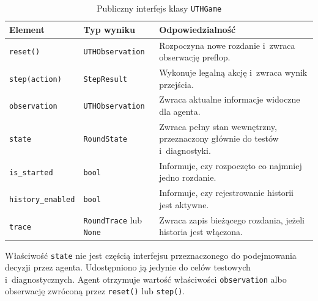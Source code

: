 \begin{table}[htbp]
    \centering
    \caption{Publiczny interfejs klasy \texttt{UTHGame}}
    \label{tab:interfejs-uth-game}
    \begin{tabular}{
        |>{\centering\arraybackslash}m{}
        |>{\centering\arraybackslash}m{}
        |p{}|
    }
        \hline
        \textbf{Element}
        &
        \textbf{Typ wyniku}
        &
        \textbf{Odpowiedzialność}
        \\
        \hline

        \texttt{reset()}
        &
        \texttt{UTHObservation}
        &
        Rozpoczyna nowe rozdanie i~zwraca obserwację preflop.
        \\
        \hline

        \texttt{step(action)}
        &
        \texttt{StepResult}
        &
        Wykonuje legalną akcję i~zwraca wynik przejścia.
        \\
        \hline

        \texttt{observation}
        &
        \texttt{UTHObservation}
        &
        Zwraca aktualne informacje widoczne dla agenta.
        \\
        \hline

        \texttt{state}
        &
        \texttt{RoundState}
        &
        Zwraca pełny stan wewnętrzny, przeznaczony głównie do testów
        i~diagnostyki.
        \\
        \hline

        \texttt{is\_started}
        &
        \texttt{bool}
        &
        Informuje, czy rozpoczęto co najmniej jedno rozdanie.
        \\
        \hline

        \texttt{history\_enabled}
        &
        \texttt{bool}
        &
        Informuje, czy rejestrowanie historii jest aktywne.
        \\
        \hline

        \texttt{trace}
        &
        \texttt{RoundTrace} lub \texttt{None}
        &
        Zwraca zapis bieżącego rozdania, jeżeli historia jest włączona.
        \\
        \hline
    \end{tabular}
\end{table}

Właściwość \texttt{state} nie jest częścią interfejsu przeznaczonego
do podejmowania decyzji przez agenta. Udostępniono ją jedynie do celów testowych
i~diagnostycznych. Agent otrzymuje
wartość właściwości \texttt{observation} albo obserwację zwróconą przez
\texttt{reset()} lub \texttt{step()}.

